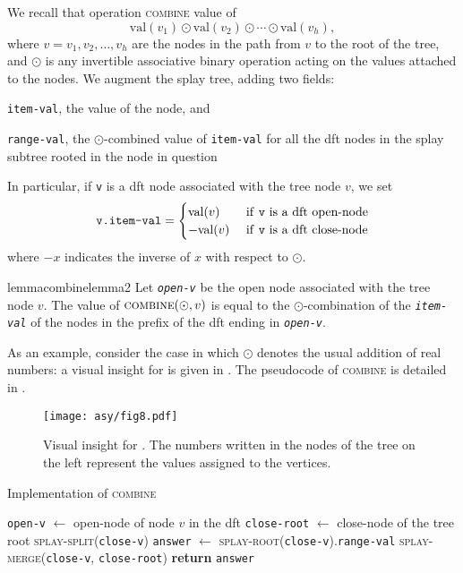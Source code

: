 \documentclass[a4paper,USenglish]{lipics}
\newcommand{\var}[1]{\textrm{\texttt{#1}}}
\begin{document}
			We recall that operation \textsc{combine}  value of $$\textrm{val}(v_1) \odot \textrm{val}(v_2) \odot \cdots \odot \textrm{val}(v_h),$$
			where $v = v_1, v_2,\ldots, v_h$ are the nodes in the path from $v$ to the root of the tree, and $\odot$ is any invertible associative binary operation acting on the values attached to the nodes. We augment the splay tree, adding two fields:
			\begin{compactitem}
				\item \var{item-val}, the value of the node, and
				\item \var{range-val}, the $\odot$-combined value of \var{item-val} for all the dft nodes in the splay subtree rooted in the node in question
			\end{compactitem}
			In particular, if \var{v} is a dft node associated with the tree node $v$, we set
			$$
			\var{v.item-val} = \begin{cases}
				\textrm{val}(v) & \text{ if \var{v} is a dft open-node}\\
				-\textrm{val}(v) & \text{ if \var{v} is a dft close-node}
			\end{cases}
			$$
			where $-x$ indicates the inverse of $x$ with respect to $\odot$.
			\begin{restatable}{lemma}{combinelemma2}
				\label{prop:combine}
Let \emph{\var{open-v}} be the open node associated with the tree node $v$. The value of $\textsc{combine}(\odot, v)$
				is equal to the $\odot$-combination of the \emph{\var{item-val}} of the nodes in the prefix of the dft ending in \emph{\var{open-v}}.
			\end{restatable}
			
As an example, consider the case in which $\odot$ denotes the usual addition of real numbers: a visual insight for  is given in . The pseudocode of \textsc{combine} is detailed in .

\begin{figure}[t!]
				\texttt{[image: asy/fig8.pdf]}
				\caption{Visual insight for \label{fig:combine example}. The numbers written in the nodes of the tree on the left represent the values assigned to the vertices.}
			\end{figure}

		

			\begin{algorithm}[H]
			  \small
			  \caption{\small Implementation of \textsc{combine}}
			  \label{algo:combine}
			  \begin{algorithmic}[1]
				    \State \var{open-v} $\gets$ open-node of node $v$ in the dft
					\State \var{close-root} $\gets$ close-node of the tree root
					\State \textsc{splay-split}(\var{close-v})
					\State \var{answer} $\gets$ \textsc{splay-root}(\var{close-v}).\var{range-val}
					\State \textsc{splay-merge}(\var{close-v}, \var{close-root})
					\State \textbf{return} \var{answer}
			    \EndProcedure
			  \end{algorithmic}
			\end{algorithm}
			
\end{document}
